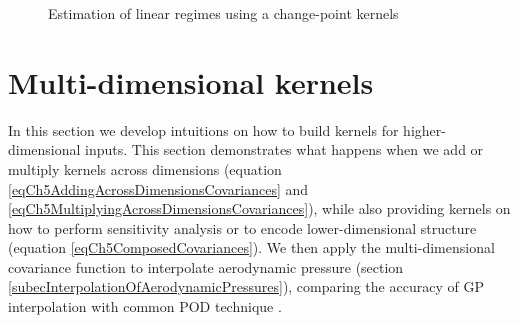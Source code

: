 \begin{figure}[!ht]
  \centering
    \quad
        \caption{Estimation of linear regimes using a change-point kernels}
        \label{figPosteriorChangePointKernel}
\end{figure}


\section{Multi-dimensional kernels}\label{secMultiDimensionalKernels}
In this section we develop intuitions on how to build kernels for higher-dimensional inputs. This section demonstrates what happens when we add or multiply kernels across dimensions (equation \ref{eqCh5AddingAcrossDimensionsCovariances} and \ref{eqCh5MultiplyingAcrossDimensionsCovariances}), while also providing kernels on how to perform sensitivity analysis or to encode lower-dimensional structure (equation \ref{eqCh5ComposedCovariances}). We then apply the multi-dimensional covariance function to interpolate aerodynamic pressure (section \ref{subecInterpolationOfAerodynamicPressures}), comparing the accuracy of GP interpolation with common POD technique \cite{oatao18004}. 

